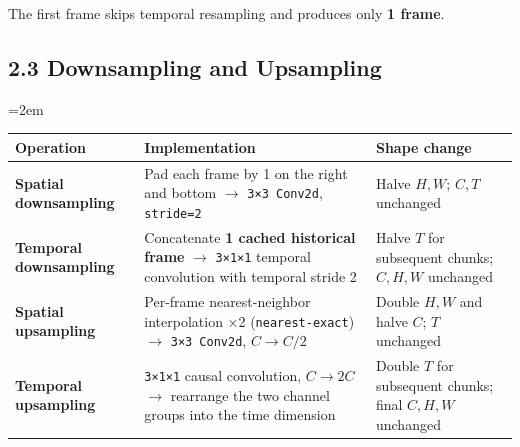 \documentclass[
  11pt,
  a4paper,
]{article}
\newcounter{none} %
\newcommand{\NotesTableStyle}{\linespread{1}\fontsize{9.5pt}{13pt}\selectfont\setlength{\tabcolsep}{4pt}\renewcommand{\arraystretch}{1.1}\setlength{\extrarowheight}{5pt}\setlength{\LTpre}{5pt}\setlength{\LTpost}{6pt}\setlength{\parskip}{0pt}\emergencystretch=2em}
\begin{document}
\endgroup

The first frame skips temporal resampling and produces only \textbf{1
frame}.


\subsection{2.3 Downsampling and Upsampling}\label{wan21-sampling}

\begingroup\NotesTableStyle\fontsize{10pt}{12pt}\selectfont\renewcommand{\arraystretch}{1.02}\setlength{\extrarowheight}{1pt}

{\def\LTcaptype{none} %
\begin{longtable}[]{@{}
  >{\raggedright\arraybackslash}p{}
  >{\raggedright\arraybackslash}p{}
  >{\raggedright\arraybackslash}p{}@{}}
\toprule\noalign{}
\begin{minipage}[b]{\linewidth}\raggedright
Operation
\end{minipage} & \begin{minipage}[b]{\linewidth}\raggedright
Implementation
\end{minipage} & \begin{minipage}[b]{\linewidth}\raggedright
Shape change
\end{minipage} \\
\midrule\noalign{}
\endhead
\bottomrule\noalign{}
\endlastfoot
\textbf{Spatial downsampling} & Pad each frame by 1 on the right and
bottom \(\rightarrow\) \texttt{3×3\ Conv2d}, \texttt{stride=2} & Halve
\(H,W\); \(C,T\) unchanged \\
\textbf{Temporal downsampling} & Concatenate \textbf{1 cached historical
frame} \(\rightarrow\) \texttt{3×1×1} temporal convolution with temporal
stride 2 & Halve \(T\) for subsequent chunks; \(C,H,W\) unchanged \\
\textbf{Spatial upsampling} & Per-frame nearest-neighbor interpolation
×2 (\texttt{nearest-exact}) \(\rightarrow\) \texttt{3×3\ Conv2d},
\(C\rightarrow C/2\) & Double \(H,W\) and halve \(C\); \(T\)
unchanged \\
\textbf{Temporal upsampling} & \texttt{3×1×1} causal convolution,
\(C\rightarrow2C\) \(\rightarrow\) rearrange the two channel groups into
the time dimension & Double \(T\) for subsequent chunks; final \(C,H,W\)
unchanged \\
\end{longtable}
}
\end{document}
